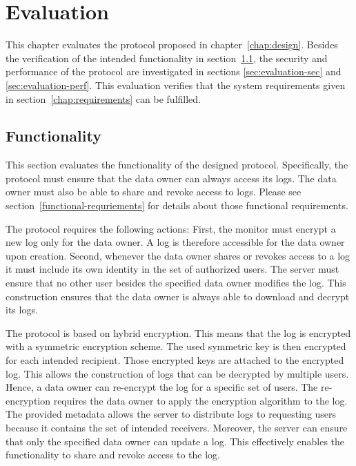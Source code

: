 \documentclass[../main.tex]{subfiles}
\begin{document}
\chapter{Evaluation}

This chapter evaluates the protocol proposed in chapter~\ref{chap:design}.
Besides the verification of the intended functionality in section~\ref{sec:evaluation-func}, the security and performance of the protocol are investigated in sections \ref{sec:evaluation-sec} and \ref{sec:evaluation-perf}.
This evaluation verifies that the system requirements given in section~\ref{chap:requirements} can be fulfilled.

\section{Functionality}
\label{sec:evaluation-func}

This section evaluates the functionality of the designed protocol.
Specifically, the protocol must ensure that the data owner can always access its logs.
The data owner must also be able to share and revoke access to logs.
Please see section~\ref{functional-requriements} for details about those functional requirements.

The protocol requires the following actions:
First, the monitor must encrypt a new log only for the data owner.
A log is therefore accessible for the data owner upon creation.
Second, whenever the data owner shares or revokes access to a log it must include its own identity in the set of authorized users.
The server must ensure that no other user besides the specified data owner modifies the log.
This construction ensures that the data owner is always able to download and decrypt its logs.

The protocol is based on hybrid encryption.
This means that the log is encrypted with a symmetric encryption scheme.
The used symmetric key is then encrypted for each intended recipient.
Those encrypted keys are attached to the encrypted log.
This allows the construction of logs that can be decrypted by multiple users.
Hence, a data owner can re-encrypt the log for a specific set of users.
The re-encryption requires the data owner to apply the encryption algorithm to the log.
The provided metadata allows the server to distribute logs to requesting users because it contains the set of intended receivers.
Moreover, the server can ensure that only the specified data owner can update a log.
This effectively enables the functionality to share and revoke access to the log.
\end{document}
